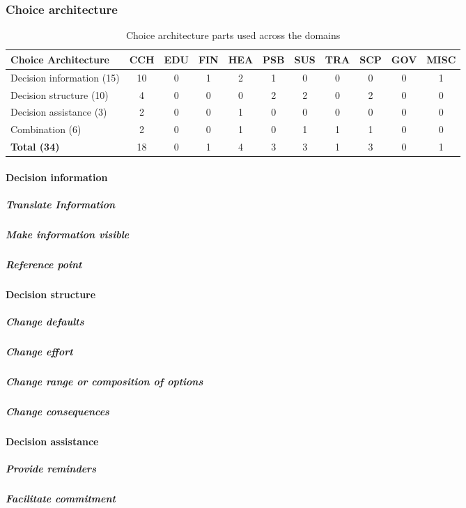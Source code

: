 \subsubsection{Choice architecture}
\begin{table}[htbp]
\centering
\small
\begin{tabular}{p{3.5cm}|cccccccccc}
\textbf{Choice Architecture} & \textbf{CCH} & \textbf{EDU} & \textbf{FIN} & \textbf{HEA} & \textbf{PSB} & \textbf{SUS} & \textbf{TRA} & \textbf{SCP} & \textbf{GOV} & \textbf{MISC} \\ \hline
Decision information (15) & 10 & 0 & 1 & 2 & 1 & 0 & 0 & 0 & 0 & 1 \\
Decision structure (10) & 4 & 0 & 0 & 0 & 2 & 2 & 0 & 2 & 0 & 0 \\
Decision assistance (3) & 2 & 0 & 0 & 1 & 0 & 0 & 0 & 0 & 0 & 0 \\
Combination (6) & 2 & 0 & 0 & 1 & 0 & 1 & 1 & 1 & 0 & 0 \\ \hline
\textbf{Total (34)} & 18 & 0 & 1 & 4 & 3 & 3 & 1 & 3 & 0 & 1
\end{tabular}
\caption{Choice architecture parts used across the domains}
\label{tabel:choice-arch-domains}
\end{table}
\paragraph{Decision information}
\subparagraph{Translate Information}
\subparagraph{Make information visible}
\subparagraph{Reference point}
\paragraph{Decision structure}
\subparagraph{Change defaults}
\subparagraph{Change effort}
\subparagraph{Change range or composition of options}
\subparagraph{Change consequences}
\paragraph{Decision assistance}
\subparagraph{Provide reminders}
\subparagraph{Facilitate commitment}